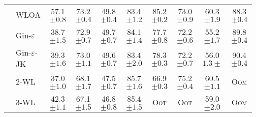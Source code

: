 \begin{table}
{\begin{tabular}{@{}c <{\enspace}@{}lcccccccc@{}}
			\\ 	
			                                                         & \textsf{WLOA}                 & 57.1  \scriptsize	$\pm 0.8$         & 73.2 \scriptsize $\pm 0.4$              & 49.8 \scriptsize $\pm 0.4$            & 83.4 \scriptsize $\pm 1.2$           & 85.2  \scriptsize $\pm 0.2$         & 73.0 \scriptsize $\pm 0.9$           & 60.3   \scriptsize $\pm 1.9$        & 88.3 \scriptsize $\pm 0.4$   \\       
			\cmidrule{2-10}		
			\multirow{2}{*}{\rotatebox{90}{\hspace*{-3pt}GNN}}       & \textsf{Gin-$\varepsilon$}    & 38.7 \scriptsize	$\pm  1.5$         & 72.9    \scriptsize $\pm 0.7$           & 49.7 \scriptsize $\pm 0.7$            & 84.1 \scriptsize $\pm 1.4$           & 77.7 \scriptsize $\pm 0.8$          & 72.2  \scriptsize $\pm 0.6$          & 55.2 \scriptsize $\pm 1.7$          & 89.8 \scriptsize $\pm 0.4$          
			\\ 
			                                                         & \textsf{Gin-$\varepsilon$-JK} & 39.3  \scriptsize	$\pm 1.6 $        & 73.0  \scriptsize $\pm 1.1$             & 49.6 \scriptsize $\pm 0.7$            & 83.4 \scriptsize $\pm 2.0$           & 78.3   \scriptsize $\pm 0.3 $       & 72.2 \scriptsize $\pm 0.7$           & 56.0  \scriptsize $1.3\pm $         & 90.4 \scriptsize $\pm 0.4$          
			\\ 
			\cmidrule{2-10}	
			\multirow{6}{*}{\rotatebox{90}{k-WL}} 	&
			\textsf{$2$-WL}       &  37.0 \scriptsize	$\pm 1.0$ &   68.1  \scriptsize $\pm 1.7$ & 47.5 \scriptsize $\pm 0.7$ &  85.7 \scriptsize $\pm 1.6$ &  66.9 \scriptsize $\pm 0.3$ &    75.2 \scriptsize $\pm 0.4$ & 60.5  \scriptsize $\pm 1.1$ &\textsc{Oom} 
			\\ 
			                                                         & \textsf{$3$-WL}               & 42.3   \scriptsize	$\pm 1.1$        & 67.1    \scriptsize $\pm 1.5$           & 46.8  \scriptsize $\pm 0.8$           & 85.4  \scriptsize $\pm 1.5$          & \textsc{Oot}                        & \textsc{Oot}                         & 59.0 \scriptsize $\pm 2.0$          & \textsc{Oom}                        
			\\      
			\cmidrule{2-10}			
					

\end{tabular}}
\end{table}
